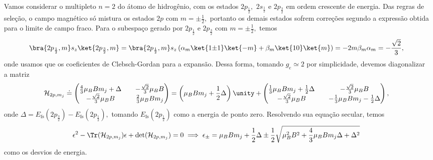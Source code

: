 Vamos considerar o multipleto \(n = 2\) do átomo de hidrogênio, com os estados \(2p_{\frac12},\) \(2s_{\frac12}\) e \(2p_{\frac32}\) em ordem crescente de energia. Das regras de seleção, o campo magnético só mistura os estados \(2p\) com \(m = \pm\frac12,\) portanto os demais estados sofrem correções segundo a expressão obtida para o limite de campo fraco. Para o subespaço gerado por \(2p_\frac12\) e \(2p_\frac32\) com \(m = \pm\frac12,\) temos 
\begin{equation*}
   \bra{2p_{\frac12}, m}s_z\ket{2p_{\frac32}, m} = \bra{2p_\frac12,m}s_z \left(\alpha_{m} \ket{1{\pm1}}\ket{-m} + \beta_{m}\ket{1 0}\ket{m}\right) = -2m \beta_m \alpha_m = - \frac{\sqrt{2}}{3},
\end{equation*}
onde usamos que os coeficientes de Clebsch-Gordan para a expansão. Dessa forma, tomando \(g_e \simeq 2\) por simplicidade, devemos diagonalizar a matriz
\begin{equation*}
   \mathcal{H}_{2p,m_j} \doteq \begin{pmatrix}
      \frac43\mu_B B m_j + \Delta && - \frac{\sqrt{2}}{3} \mu_B B\\
      - \frac{\sqrt{2}}{3}\mu_B B && \frac23\mu_B B m_j
   \end{pmatrix} = \left(\mu_B Bm_j + \frac12\Delta\right)\unity + \begin{pmatrix}
      \frac13\mu_B B m_j + \frac12\Delta && - \frac{\sqrt{2}}{3} \mu_B B\\
      - \frac{\sqrt{2}}{3}\mu_B B && -\frac13\mu_B B m_j - \frac12 \Delta
   \end{pmatrix},
\end{equation*}
onde \(\Delta = E_{\mathrm{fs}}(2p_\frac32) - E_\mathrm{fs}(2p_\frac12),\) tomando \(E_\mathrm{fs}(2p_\frac12)\) como a energia de ponto zero. Resolvendo sua equação secular, temos
\begin{equation*}
   \epsilon^2 - \Tr(\mathcal{H}_{2p, m_j}) \epsilon + \det(\mathcal{H}_{2p,m_j}) = 0 \implies \epsilon_\pm = \mu_B B m_j + \frac12 \Delta \pm \frac12\sqrt{\mu_B^2 B^2 + \frac43 \mu_B B m_j \Delta + \Delta^2}
\end{equation*}
como os desvios de energia.
